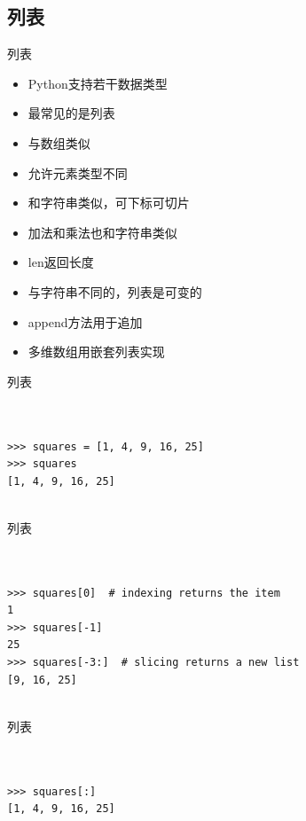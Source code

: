 \documentclass{beamer}
\begin{document}
\subsection{列表}

\begin{frame}[t]{列表}

\begin{itemize}
    \item Python支持若干数据类型
    \item 最常见的是列表
    \item 与数组类似
    \item 允许元素类型不同
    \item 和字符串类似，可下标可切片
    \item 加法和乘法也和字符串类似
    \item len返回长度
    \item 与字符串不同的，列表是可变的
    \item append方法用于追加
    \item 多维数组用嵌套列表实现
        
\end{itemize}


\end{frame}


\begin{frame}[t,fragile]{列表}


\begin{verbatim}


>>> squares = [1, 4, 9, 16, 25]
>>> squares
[1, 4, 9, 16, 25]


\end{verbatim}


\end{frame}


\begin{frame}[t,fragile]{列表}


\begin{verbatim}


>>> squares[0]  # indexing returns the item
1
>>> squares[-1]
25
>>> squares[-3:]  # slicing returns a new list
[9, 16, 25]


\end{verbatim}


\end{frame}

\begin{frame}[t,fragile]{列表}


\begin{verbatim}


>>> squares[:]
[1, 4, 9, 16, 25]


\end{verbatim}


\end{frame}
\end{document}
